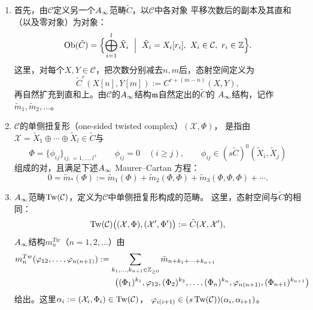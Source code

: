 \begin{enumerate}[label=\arabic*.,leftmargin=2.4em,itemsep=4pt,topsep=4pt]
\item 首先，由$\mathcal{C}$定义另一个$A_{\infty}$范畴$\tilde{C}$，以$\mathcal{C}$中各对象
平移次数后的副本及其直和（以及零对象）为对象：
\[
  \Ob(\tilde{C})=\Bigl\{\bigoplus_{i=1}^{l}\tilde{X}_{i}
  \ \Bigm|\ \tilde{X}_{i}=X_{i}[r_{i}],\ X_{i}\in\mathcal{C},\ r_{i}\in\Z\Bigr\}.
\]
这里，对每个$X,Y\in\mathcal{C}$，把次数分别减去$n,m$后，态射空间定义为
\begin{equation}
  \tilde{C}^{r}(X[n],Y[m]):=C^{r+(m-n)}(X,Y),
  \label{eq:c02-5}
\end{equation}
再自然扩充到直和上。由$\mathcal{C}$的$A_{\infty}$结构$\mathfrak{m}$自然定出的$\tilde{C}$的
$A_{\infty}$结构，记作$\tilde{m}_{1},\tilde{m}_{2},\dots$。


\item $\mathcal{C}$的单侧扭复形（one-sided twisted complex）$(\mathcal{X},\Phi)$，
是指由$\mathcal{X}=\tilde{X}_{1}\oplus\cdots\oplus\tilde{X}_{l}\in\tilde{C}$与
\begin{equation}
  \Phi=\{\phi_{ij}\}_{ij,=1,\dots,l},\qquad
  \phi_{ij}=0\quad(i\ge j),\qquad
  \phi_{ij}\in(s\tilde{C})^{0}(\tilde{X}_{i},\tilde{X}_{j})
  \label{eq:c02-6}
\end{equation}
组成的对，且满足下述$A_{\infty}$ Maurer--Cartan 方程：
\[
  0=\tilde{m}_{*}(\Phi):=\tilde{m}_{1}(\Phi)+\tilde{m}_{2}(\Phi,\Phi)
  +\tilde{m}_{3}(\Phi,\Phi,\Phi)+\cdots.
\]


\item $A_{\infty}$范畴$\operatorname{Tw}(\mathcal{C})$，定义为$\mathcal{C}$中单侧扭复形构成的范畴。
这里，态射空间与$\tilde{C}$的相同：
\[
  \operatorname{Tw}(\mathcal{C})\bigl((\mathcal{X},\Phi),(\mathcal{X}',\Phi')\bigr)
  :=\tilde{C}(\mathcal{X},\mathcal{X}'),
\]
$A_{\infty}$结构$m_{n}^{Tw}$（$n=1,2,\dots$）由
\[
\begin{aligned}
  m_{n}^{Tw}(\varphi_{12},\dots,\varphi_{n(n+1)}) &:=
  \sum_{k_{1},\dots,k_{n+1}\in\mathbb{Z}_{\ge 0}}
  \tilde{m}_{n+k_{1}+\cdots+k_{n+1}}\\
  &\qquad\bigl((\Phi_{1})^{k_{1}},\varphi_{12},(\Phi_{2})^{k_{2}},\dots,
  (\Phi_{n})^{k_{n}},\varphi_{n(n+1)},(\Phi_{n+1})^{k_{n+1}}\bigr)
\end{aligned}
\]
给出。这里$\alpha_{i}:=(\mathcal{X}_{i},\Phi_{i})\in\operatorname{Tw}(\mathcal{C})$，
$\varphi_{i(i+1)}\in(s\operatorname{Tw}(\mathcal{C}))(\alpha_{i},\alpha_{i+1})$。
\end{enumerate}

